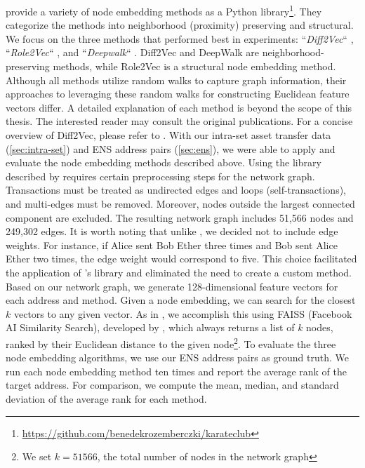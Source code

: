 \documentclass[12pt,a4paper,titlepage,oneside,english]{article}
\begin{document}
\cite{karateclub} provide a variety of node embedding methods as a Python library\footnote{\url{https://github.com/benedekrozemberczki/karateclub}}. They categorize the methods into neighborhood (proximity) preserving and structural. \newline
We focus on the three methods that performed best in \cite{Beres2020} experiments: ``\textit{Diff2Vec}`` \citep{rozemberczki2020difftovec}, ``\textit{Role2Vec}`` \citep{ahmed2018roletovec}, and ``\textit{Deepwalk}`` \citep{perozzi2014}. Diff2Vec and DeepWalk are neighborhood-preserving methods, while Role2Vec is a structural node embedding method. Although all methods utilize random walks to capture graph information, their approaches to leveraging these random walks for constructing Euclidean feature vectors differ. A detailed explanation of each method is beyond the scope of this thesis. The interested reader may consult the original publications. For a concise overview of Diff2Vec, please refer to \cite{wu2022tutela}. \newline
With our intra-set asset transfer data (\ref{sec:intra-set}) and ENS address pairs (\ref{sec:ens}), we were able to apply and evaluate the node embedding methods described above. Using the library described by \cite{karateclub} requires certain preprocessing steps for the network graph. Transactions must be treated as undirected edges and loops (self-transactions), and multi-edges must be removed. Moreover, nodes outside the largest connected component are excluded. The resulting network graph includes 51,566 nodes and 249,302 edges. \newline
It is worth noting that unlike \cite{wu2022tutela}, we decided not to include edge weights. For instance, if Alice sent Bob Ether three times and Bob sent Alice Ether two times, the edge weight would correspond to five. This choice facilitated the application of \cite{rozemberczki2020difftovec}'s library and eliminated the need to create a custom method. Based on our network graph, we generate 128-dimensional feature vectors for each address and method. \newline
Given a node embedding, we can search for the closest $k$ vectors to any given vector. As in \cite{wu2022tutela}, we accomplish this using FAISS (Facebook AI Similarity Search), developed by \cite{johnson2019faiss}, which always returns a list of $k$ nodes, ranked by their Euclidean distance to the given node\footnote{We set $k = 51566$, the total number of nodes in the network graph}. \newline
To evaluate the three node embedding algorithms, we use our ENS address pairs as ground truth. We run each node embedding method ten times and report the average rank of the target address. For comparison, we compute the mean, median, and standard deviation of the average rank for each method.
\end{document}
